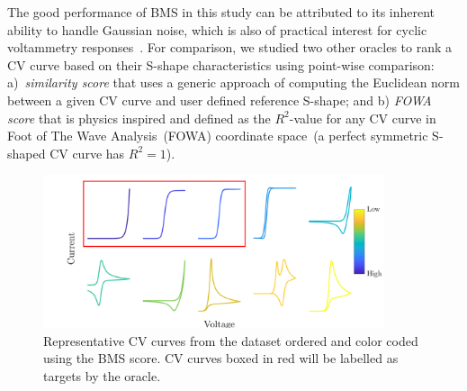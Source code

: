 The good performance of BMS in this study can be attributed to its inherent ability to handle Gaussian noise, which is also of practical interest for cyclic voltammetry responses~\cite{gavaghan2018use}. 
For comparison, we studied two other oracles to rank a CV curve based on their S-shape characteristics using point-wise comparison: a)~\textit{similarity score} that uses a generic approach of computing the Euclidean norm between a given CV curve and user defined reference S-shape; and b) \textit{FOWA score} that is physics inspired and defined as the \(R^2\)-value for any CV curve in Foot of The Wave Analysis~(FOWA) coordinate space~(a perfect symmetric S-shaped CV curve has \(R^2=1\)). 
\begin{figure}[h]
    \centering
    \includegraphics[width=100mm]{Chapter-3/figures/repbmsspectrum.png}
    \caption{Representative CV curves from the dataset ordered and color coded using the BMS score. CV curves boxed in red will be labelled as targets by the oracle.}
    \label{fig:repbmsscores}
\end{figure}

